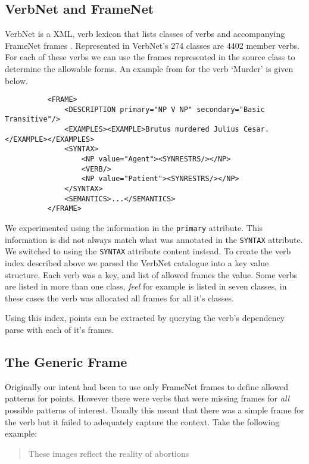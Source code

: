     \subsection{VerbNet and FrameNet}
      VerbNet is a XML, verb lexicon that lists classes of verbs and accompanying FrameNet \cite{fillmore2002framenet} frames \cite{schuler2005verbnet}. Represented in VerbNet's 274 classes are 4402 member verbs. For each of these verbs we can use the frames represented in the source class to determine the allowable forms. An example from for the verb `Murder' is given below.

      \lstset{language=XML}
      \begin{lstlisting}
          <FRAME>
              <DESCRIPTION primary="NP V NP" secondary="Basic Transitive"/>
              <EXAMPLES><EXAMPLE>Brutus murdered Julius Cesar.</EXAMPLE></EXAMPLES>
              <SYNTAX>
                  <NP value="Agent"><SYNRESTRS/></NP>
                  <VERB/>
                  <NP value="Patient"><SYNRESTRS/></NP>
              </SYNTAX>
              <SEMANTICS>...</SEMANTICS>
          </FRAME>
      \end{lstlisting}

      We experimented using the information in the \texttt{primary} attribute. This information is did not always match what was annotated in the \texttt{SYNTAX} attribute. We switched to using the \texttt{SYNTAX} attribute content instead. To create the verb index described above we parsed the VerbNet catalogue into a key value structure. Each verb was a key, and list of allowed frames the value. Some verbs are listed in more than one class, \textit{feel} for example is listed in seven classes, in these cases the verb was allocated all frames for all it's classes.

      Using this index, points can be extracted by querying the verb's dependency parse with each of it's frames.

    \subsection{The Generic Frame}
      Originally our intent had been to use only FrameNet frames to define allowed patterns for points. However there were verbs that were missing frames for \textit{all} possible patterns of interest. Usually this meant that there was a simple frame for the verb but it failed to adequately capture the context. Take the following example:

      \blockquote{These images reflect the reality of abortions}

